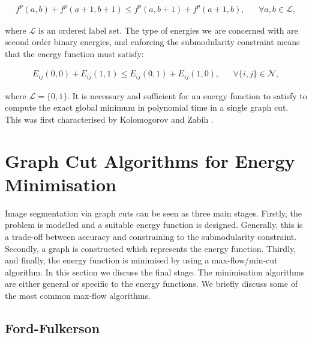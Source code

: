 \begin{align}
&f^p(a,b) + f^p(a+1,b+1) \leq f^p(a,b+1) + f^p(a+1,b),&  &\forall a,b \in \mathcal{L},&
\end{align}

where $\mathcal{L}$ is an ordered label set. The type of energies we are concerned with are second order binary energies, and enforcing the submodularity constraint means that the energy function must satisfy:

\begin{align}
&E_{ij}(0,0) + E_{ij}(1,1) \leq E_{ij}(0,1) + E_{ij}(1,0),&  &\forall \{i,j\} \in \mathcal{N},&
\label{eq:submodular_energy}
\end{align}

where $\mathcal{L}=\{0,1\}$. It is necessary and sufficient for an energy function to satisfy  to compute the exact global minimum in polynomial time in a single graph cut. This was first characterised by Kolomogorov and Zabih \citep{Kolmogorov2004}.


\section{Graph Cut Algorithms for Energy Minimisation}
\label{sec:MaxFlowMinCutAlgoithms}

Image segmentation via graph cuts can be seen as three main stages. Firstly, the problem is modelled and a suitable energy function is designed. Generally, this is a trade-off between accuracy and constraining to the submodularity constraint. Secondly, a graph is constructed which represents the energy function. Thirdly, and finally, the energy function is minimised by using a max-flow/min-cut algorithm. In this section we discuss the final stage. The minimisation algorithms are either general or specific to the energy functions. We briefly discuss some of the most common max-flow algorithms.

\subsection{Ford-Fulkerson}
\label{sec:FordFulkerson}

